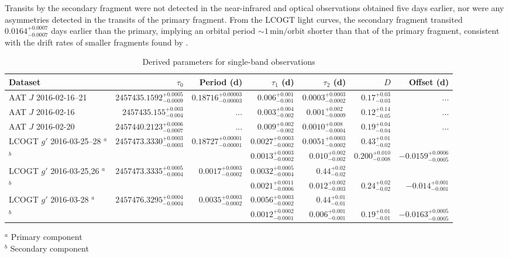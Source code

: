 \documentclass[iop,useAMES,usenatbig]{emulateapj}
\begin{document}
Transits by the secondary fragment were not detected in the near-infrared and optical observations obtained five days earlier, nor were any asymmetries detected in the transits of the primary fragment. From the LCOGT light curves, the secondary fragment transited $0.0164_{-0.0007}^{+0.0007}$ days earlier than the primary, implying an orbital period $\sim 1\,\mathrm{min/orbit}$ shorter than that of the primary fragment, consistent with the drift rates of smaller fragments found by \citet{2016MNRAS.tmp..406R}.   


\begin{table}
    \caption{Derived parameters for single-band observations}
    \label{tab:single_obs}
    \centering
    \begin{tabular}{lrrrrrr}
    \hline\hline
        Dataset & $\tau_0$ & Period (d) & $\tau_1$ (d) & $\tau_2$ (d) & $D$ & Offset (d) \\
    \hline
        AAT $J$ 2016-02-16--21 & $2457435.1592_{-0.0009}^{+0.0005}$ & $0.18716_{-0.00003}^{+0.00003}$ & $0.006_{-0.001}^{+0.001}$ & $0.0003_{-0.0002}^{+0.0003}$ & $0.17_{-0.03}^{+0.03}$ & ... \\
        AAT $J$ 2016-02-16 & $2457435.155_{-0.004}^{+0.003}$ & ... & $0.003_{-0.002}^{+0.004}$ & $0.001_{-0.0009}^{+0.002}$ & $0.12_{-0.05}^{+0.14}$ & ...\\
        AAT $J$ 2016-02-20 & $2457440.2123_{-0.0007}^{+0.0006}$ & ... & $0.009_{-0.002}^{+0.002}$ & $0.0010_{-0.0004}^{+0.008}$ & $0.19_{-0.04}^{+0.04}$ & ...\\
        LCOGT $g'$ 2016-03-25--28 $^a$& $2457473.3330_{-0.0003}^{+0.0003}$ & $0.18727_{-0.00001}^{+0.00001}$ & $0.0027_{-0.0002}^{+0.0003}$ & $0.0051_{-0.0002}^{+0.0003}$ & $0.43_{-0.02}^{+0.01}$ & \\
        $^b$&&& $0.0013_{-0.0002}^{+0.0003}$ & $0.010_{-0.002}^{+0.002}$ & $0.200_{-0.008}^{+0.010}$ & $-0.0159_{-0.0005}^{+0.0006}$\\ 
        LCOGT $g'$ 2016-03-25,26 $^a$ & $2457473.3335_{-0.0004}^{+0.0005}$ & $0.0017_{-0.0002}^{+0.0003}$ & $0.0032_{-0.0004}^{+0.0005}$ & $0.44_{-0.02}^{+0.02}$ & \\
        $^b$ &&& $0.0021_{-0.0006}^{+0.0011}$ & $0.012_{-0.003}^{+0.002}$ & $0.24_{-0.02}^{+0.02}$ & $-0.014_{-0.001}^{+0.001}$\\ 
        LCOGT $g'$ 2016-03-28 $^a$& $2457476.3295_{-0.0004}^{+0.0004}$ & $0.0035_{-0.0002}^{+0.0003}$ & $0.0056_{-0.0002}^{+0.0003}$ & $0.44_{-0.01}^{+0.01}$ & \\
        $^b$ &&& $0.0012_{-0.0001}^{+0.0002}$ & $0.006_{-0.001}^{+0.001}$ & $0.19_{-0.01}^{+0.01}$ & $-0.0163_{-0.0005}^{+0.0005}$\\         
    \hline
    \end{tabular}
    \begin{flushleft}
    $^a$ Primary component\\
    $^b$ Secondary component
    \end{flushleft}
\end{table}
\end{document}
